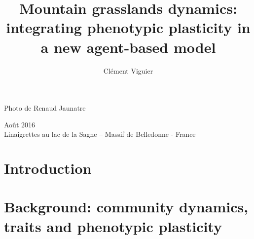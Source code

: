 \documentclass[a4paper, notoc, justified,marginals=left, nobib]{tufte-book}
\title{Mountain grasslands dynamics: integrating phenotypic plasticity in a new agent-based model}
\author{Clément Viguier}
\makeatletter
\renewcommand\chapter{\thispagestyle{plain}%
\global\@topnum\z@
\@afterindentfalse
\secdef\@chapter\@schapter}
\newcommand{\fwnewthought}[1]{\begin{fullwidth}\newthought{#1}\end{fullwidth}}
\makeatother
\begin{document}


\vspace*{4cm}
\noindent Photo de Renaud Jaunatre


\vspace{1cm}
 Août 2016\\
\noindent Linaigrettes au lac de la Sagne – Massif de Belledonne - France

\newpage

\cleardoublepage





\part{Introduction}\label{part:introduction}
\begin{refsection}


\begin{fullwidth}
\printbibliography[heading=bibliography] 
\end{fullwidth}
\end{refsection}

\part{Background: community dynamics, traits and phenotypic plasticity}\label{part:literature}
\begin{refsection}
\setcounter{chapter}{0}



\begin{fullwidth}
\printbibliography[heading=bibliography] 
\end{fullwidth}
\end{refsection}
\end{document}
